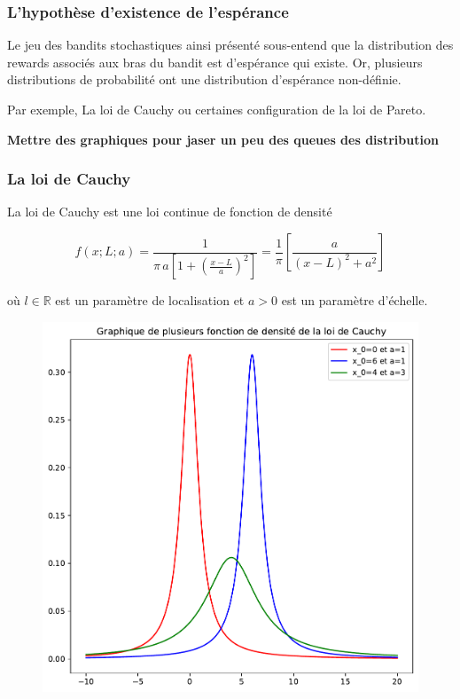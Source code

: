 \documentclass[8pt, sans]{beamer}
\begin{document}
\begin{frame}
\frametitle{L'hypothèse d'existence de l'espérance}
Le jeu des bandits stochastiques ainsi présenté sous-entend que la distribution des rewards associés aux bras du bandit est d'espérance qui existe. Or, plusieurs distributions de probabilité ont une distribution d'espérance non-définie. 

\pause
\vfill

Par exemple, La loi de Cauchy ou certaines configuration de la loi de Pareto.

\pause
\vfill
\textbf{Mettre des graphiques pour jaser un peu des queues des distribution}

\end{frame}

\begin{frame}
\frametitle{La loi de Cauchy}
La loi de Cauchy est une loi continue de fonction de densité 

$$f(x;L;a)=\frac{1}{\pi\,a\left[1+\left(\frac{x-L}{a}\right)^2\right]}=\frac{1}{\pi}\left[\frac{a}{(x-L)^2+a^2}\right]$$

où $l\in\mathbb{R}$ est un paramètre de localisation et $a>0$ est un paramètre d'échelle.

\pause

\begin{figure}[H]
\begin{center}
\includegraphics[scale=0.3]{graphiques_Cauchy.pdf}
\end{center}
\end{figure}

\end{frame}
\end{document}
